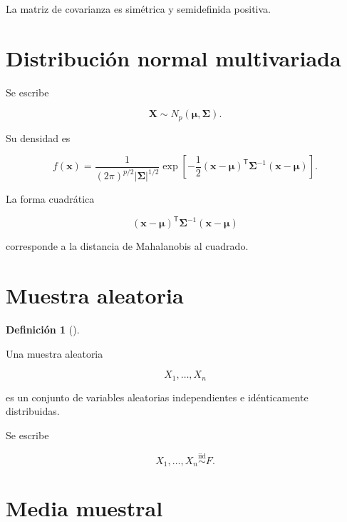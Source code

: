 \documentclass[
  spanish,
  10.5pt,
  letterpaper,
  DIV=11,
  numbers=noendperiod,
  oneside,
  open=any]{scrreprt}
\theoremstyle{definition}
\newtheorem{definition}{Definición}[chapter]
\theoremstyle{definition}
\theoremstyle{plain}
\theoremstyle{remark}
\begin{document}
La matriz de covarianza es simétrica y semidefinida positiva.

\section*{Distribución normal
multivariada}\label{distribuciuxf3n-normal-multivariada}


Se escribe

\[
\mathbf{X}
\sim
N_p(\boldsymbol{\mu},\boldsymbol{\Sigma}).
\]

Su densidad es

\[
f(\mathbf{x})
=
\frac{
1
}{
(2\pi)^{p/2}
|\boldsymbol{\Sigma}|^{1/2}
}
\exp
\left[
-\frac{1}{2}
(\mathbf{x}-\boldsymbol{\mu})^{\mathsf T}
\boldsymbol{\Sigma}^{-1}
(\mathbf{x}-\boldsymbol{\mu})
\right].
\]

La forma cuadrática

\[
(\mathbf{x}-\boldsymbol{\mu})^{\mathsf T}
\boldsymbol{\Sigma}^{-1}
(\mathbf{x}-\boldsymbol{\mu})
\]

corresponde a la distancia de Mahalanobis al cuadrado.

\section*{Muestra aleatoria}\label{muestra-aleatoria}


\begin{definition}[]\protect\hypertarget{def-muestra-aleatoria}{}\label{def-muestra-aleatoria}

Una muestra aleatoria

\[
X_1,\ldots,X_n
\]

es un conjunto de variables aleatorias independientes e idénticamente
distribuidas.

\end{definition}

Se escribe

\[
X_1,\ldots,X_n
\overset{\text{iid}}{\sim}
F.
\]

\section*{Media muestral}\label{media-muestral}
\end{document}
